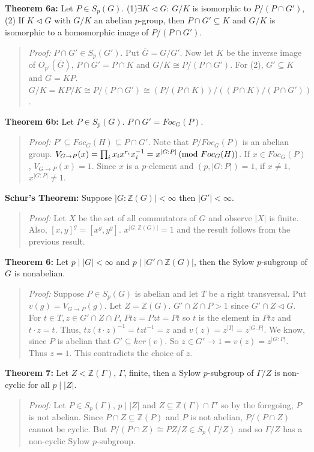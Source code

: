 {\bf Theorem 6a:} Let $P \in S_p(G)$. (1)$\exists K \lhd G$: $G/K$ is isomorphic to
$P/(P \cap G')$, (2) If $K \lhd G$ with $G/K$ an abelian $p$-group, then $P \cap G' \subseteq K$
and $G/K$ is isomorphic to a homomorphic image of $P/(P \cap G')$.
\begin{quote}
\emph{Proof:}
$P \cap G' \in S_p(G')$.  Put ${\overline G} = G/G'$.  Now let $K$ be the inverse image
of $O_{p'}({\overline G})$, $P \cap G' = P \cap K$ and $G/K \cong  P/(P \cap G')$.
For (2), $G' \subseteq K$ and $G=KP$.  $G/K = KP/K \cong P / (P \cap G') \cong  (P / (P \cap K)) /((P \cap K) / (P \cap G'))$.
\end{quote}
{\bf Theorem 6b:} Let $P \in S_p(G)$. $P \cap G' = Foc_G(P)$.
\begin{quote}
\emph{Proof:}
$P' \subseteq Foc_G(H) \subseteq P \cap G'$.  Note that $P/Foc_G(P)$ is an abelian
group. $V_{G \rightarrow P}(x)= \prod_i x_i x^{r_i} x_i^{-1} = x^{|G:P|} \thinspace \textnormal{(mod } Foc_G(H) \textnormal{)}$.
If $x \in Foc_G(P)$, $V_{G \rightarrow P}(x)=1$.  Since $x$ is a $p$-element and $(p, |G:P|)=1$,
if $x \ne 1$, $x^{|G:P|} \ne 1$.
\end{quote}
{\bf Schur's Theorem:} 
Suppose $|G:{\mathbb Z}(G)| < \infty$ then $|G'|< \infty$.
\begin{quote}
\emph{Proof:}  
Let $X$ be the set of all commutators of $G$ and observe $|X|$ is finite.  Also,
$[x,y]^g= [x^g, y^g]$.  
$x^{|G:{\mathbb Z }(G)|}=1$ and the result follows from the previous result.
\end{quote}
{\bf Theorem 6:} Let $p \mid |G| < \infty$ and $p \mid |G' \cap {\mathbb Z}(G)|$, then
the Sylow $p$-subgroup of $G$ is nonabelian.
\begin{quote}
\emph{Proof:}  
Suppose $P \in S_p(G)$ is abelian and let $T$ be a right transversal.  Put
$v(g)= V_{G \rightarrow P}(g)$. Let $Z= {\mathbb Z}(G)$.  
$G' \cap Z \cap P > 1$ since $G' \cap Z \lhd G$.
For $t \in T, z \in G' \cap Z \cap P$, $Ptz=Pzt=Pt$ so $t$ is the element in $Ptz$ and
$t \cdot z= t$.  Thus, $tz(t \cdot z)^{-1}= tzt^{-1}=z$ and $v(z)= z^{|T|}=z^{|G:P|}$.
We know, since $P$ is abelian that $G' \subseteq ker(v)$. So 
$z \in G'\rightarrow 1=v(z)=z^{|G:P|}$.  Thus $z=1$.  This contradicts the choice of $z$.
\end{quote}
{\bf Theorem 7:} Let $Z < {\mathbb Z}(\Gamma)$, $\Gamma$, finite, then a Sylow $p$-subgroup of
$\Gamma/Z$ is non-cyclic for all $p \mid |Z|$.
\begin{quote}
\emph{Proof:}  
Let $P \in S_p( \Gamma )$, $p \mid |Z|$ and $Z \subseteq {\mathbb Z}( \Gamma ) \cap \Gamma'$
so by the foregoing, $P$ is not abelian.  Since $P \cap Z \subseteq {\mathbb Z}(P)$ and
$P$ is not abelian, $P/(P \cap Z)$ cannot be cyclic.  
But $P/(P \cap Z) \cong PZ/Z \in S_p(\Gamma/Z)$ and so $\Gamma/Z$ has a 
non-cyclic Sylow $p$-subgroup.
\end{quote}
